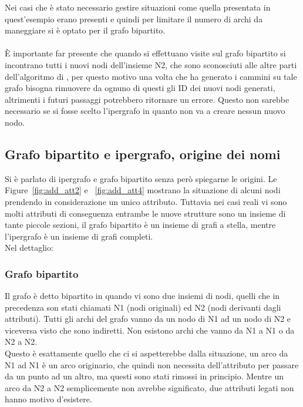 Nei casi che è stato necessario gestire situazioni come quella presentata in quest'esempio erano presenti e quindi per limitare il numero di archi da maneggiare si è optato per il grafo bipartito.\\
\\
È importante far presente che quando si effettuano visite sul grafo bipartito si incontrano tutti i nuovi nodi dell'insieme N2, che sono sconosciuti alle altre parti dell'algoritmo di \cnrl, per questo motivo una volta che \nv ha generato i cammini su tale grafo bisogna rimuovere da ognuno di questi gli ID dei nuovi nodi generati, altrimenti i futuri passaggi potrebbero ritornare un errore. Questo non sarebbe necessario se si fosse scelto l'ipergrafo in quanto non va a creare nessun nuovo nodo.
%
\subsection{Grafo bipartito e ipergrafo, origine dei nomi}
Si è parlato di ipergrafo e grafo bipartito senza però spiegarne le origini. Le Figure~\ref{fig:add_att2} e ~\ref{fig:add_att4} mostrano la situazione di alcuni nodi prendendo in considerazione un unico attributo. Tuttavia nei casi reali vi sono molti attributi di conseguenza entrambe le nuove strutture sono un insieme di tante piccole sezioni, il grafo bipartito è un insieme di grafi a stella, mentre l'ipergrafo è un insieme di grafi completi.\\
Nel dettaglio:
%
\subsubsection*{Grafo bipartito}
Il grafo è detto bipartito in quando vi sono due insiemi di nodi, quelli che in precedenza son stati chiamati N1 (nodi originali) ed N2 (nodi derivanti dagli attributi). Tutti gli archi del grafo vanno da un nodo di N1 ad un nodo di N2 e viceversa visto che sono indiretti. Non esistono archi che vanno da N1 a N1 o da N2 a N2.\\
Questo è esattamente quello che ci si aspetterebbe dalla situazione, un arco da N1 ad N1 è un arco originario, che quindi non necessita dell'attributo per passare da un punto ad un altro, ma questi sono stati rimossi in principio. Mentre un arco da N2 a N2 semplicemente non avrebbe significato, due attributi legati non hanno motivo d'esistere.
%
